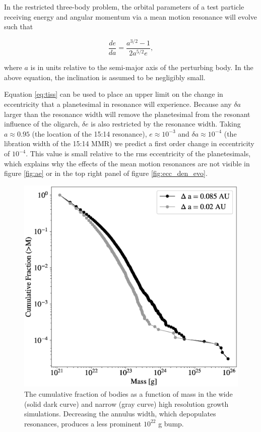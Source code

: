 In the restricted three-body problem, the orbital parameters of a test particle receiving energy and angular momentum via a 
mean motion resonance will evolve such that \cite{murray00}

\begin{equation}\label{eq:tiss}
\frac{de}{da} = \frac{a^{3/2} - 1}{2 a^{5/2} e},
\end{equation}

\noindent where $a$ is in units relative to the semi-major axis of the perturbing body. In the above equation, the inclination is 
assumed to be negligibly small.

Equation \ref{eq:tiss} can be used to place an upper limit on the change in eccentricity that a planetesimal in resonance will 
experience. Because any $\delta a$ larger than the resonance width will remove the planetesimal from the resonant influence of 
the oligarch, $\delta e$ is also restricted by the resonance width. Taking $a \approx 0.95$ (the location of the 15:14 resonance), 
$e \approx 10^{-3}$ and $\delta a \approx 10^{-4}$ (the libration width of the 15:14 MMR) we predict a first order change in 
eccentricity of $10^{-4}$. This value is small relative to the rms eccentricity of the planetesimals, which explains why the effects 
of the  mean motion resonances are not visible in figure \ref{fig:ae} or in the top right panel of figure \ref{fig:ecc_den_evo}.

\begin{figure}
    \includegraphics[width=\columnwidth]{figures/plSS/mass_spectrum_comp.eps}
    \caption{The cumulative fraction of bodies as a function of mass in the wide (solid dark curve) and narrow (gray curve) high 
    resolution growth simulations. Decreasing the annulus width, which depopulates resonances, produces a less prominent 
    $10^{22}$ g bump.
    \label{fig:mass_spectrum_comp}}
\end{figure}

